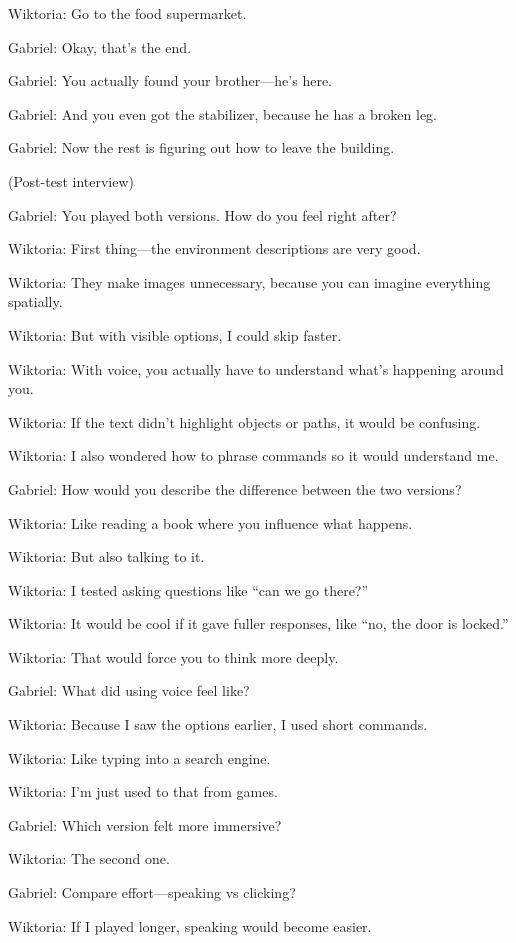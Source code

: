 Wiktoria: Go to the food supermarket.

Gabriel: Okay, that’s the end.

Gabriel: You actually found your brother—he’s here.

Gabriel: And you even got the stabilizer, because he has a broken leg.

Gabriel: Now the rest is figuring out how to leave the building.

(Post-test interview)

Gabriel: You played both versions. How do you feel right after?

Wiktoria: First thing—the environment descriptions are very good.

Wiktoria: They make images unnecessary, because you can imagine everything spatially.

Wiktoria: But with visible options, I could skip faster.

Wiktoria: With voice, you actually have to understand what’s happening around you.

Wiktoria: If the text didn’t highlight objects or paths, it would be confusing.

Wiktoria: I also wondered how to phrase commands so it would understand me.

Gabriel: How would you describe the difference between the two versions?

Wiktoria: Like reading a book where you influence what happens.

Wiktoria: But also talking to it.

Wiktoria: I tested asking questions like “can we go there?”

Wiktoria: It would be cool if it gave fuller responses, like “no, the door is locked.”

Wiktoria: That would force you to think more deeply.

Gabriel: What did using voice feel like?

Wiktoria: Because I saw the options earlier, I used short commands.

Wiktoria: Like typing into a search engine.

Wiktoria: I’m just used to that from games.

Gabriel: Which version felt more immersive?

Wiktoria: The second one.

Gabriel: Compare effort—speaking vs clicking?

Wiktoria: If I played longer, speaking would become easier.

